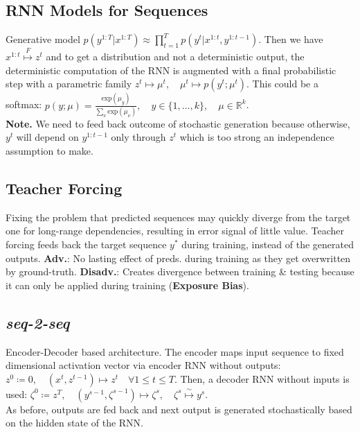 \subsection{RNN Models for Sequences}
Generative model $p\left(y^{1:T}|x^{1:T}\right) \approx \prod_{t=1}^T p\left(y^t | x^{1:t}, y^{1:t-1}\right)$. Then we have $x^{1:t} \overset{F}{\mapsto} z^t$ and to get a distribution and not a deterministic output, the deterministic computation of the RNN is augmented with a final probabilistic step with a parametric family $z^t \mapsto \mu^t, \quad \mu^t \mapsto p(y^t; \mu^t)$. This could be a softmax: $p(y; \mu) = \frac{\text{exp}(\mu_y)}{\sum_\nu \text{exp}(\mu_\nu)}, \quad y \in \{1,...,k\}, \quad \mu \in \mathbb{R}^k$. \\
\textbf{Note.} We need to feed back outcome of stochastic generation because otherwise, $y^t$ will depend on $y^{1:t-1}$ only through $z^t$ which is too strong an independence assumption to make.

\subsection{Teacher Forcing}
Fixing the problem that predicted sequences may quickly diverge from the target one for long-range dependencies, resulting in error signal of little value. Teacher forcing feeds back the target sequence $y^*$ during training, instead of the generated outputs. \textbf{Adv.}: No lasting effect of preds. during training as they get overwritten by ground-truth. \textbf{Disadv.}: Creates divergence between training \& testing because it can only be applied during training (\textbf{Exposure Bias}).

\subsection{\emph{seq-2-seq}}
Encoder-Decoder based architecture. The encoder maps input sequence to fixed dimensional activation vector via encoder RNN without outputs: $z^0 \coloneqq 0, \quad (x^t, z^{t-1}) \mapsto z^t \quad \forall 1 \leq t \leq T$. Then, a decoder RNN without inputs is used: $\zeta^0 \coloneqq z^T, \quad (y^{s-1}, \zeta^{s-1}) \mapsto \zeta^s, \quad \zeta^s \overset{\sim}{\mapsto} y^s$. \\
As before, outputs are fed back and next output is generated stochastically based on the hidden state of the RNN.